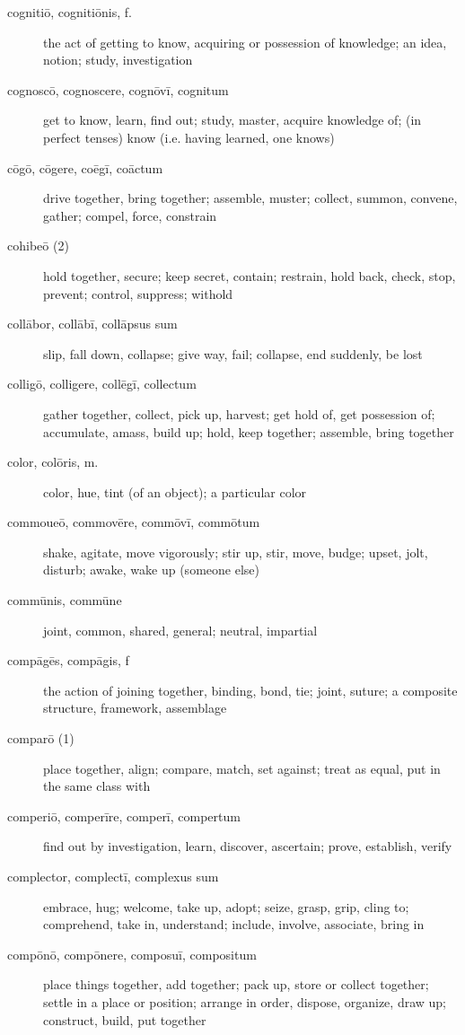 \begin{description}
    \item[cognitiō, cognitiōnis, f.] the act of getting to know, acquiring or possession of knowledge; an idea, notion; study, investigation
    \item[cognoscō, cognoscere, cognōvī, cognitum] get to know, learn, find out; study, master, acquire knowledge of; (in perfect tenses) know (i.e. having learned, one knows)
    \item[cōgō, cōgere, coēgī, coāctum] drive together, bring together; assemble, muster; collect, summon, convene, gather; compel, force, constrain
    \item[cohibeō (2)] hold together, secure; keep secret, contain; restrain, hold back, check, stop, prevent; control, suppress; withold
    \item[collābor, collābī, collāpsus sum] slip, fall down, collapse; give way, fail; collapse, end suddenly, be lost
    \item[colligō, colligere, collēgī, collectum] gather together, collect, pick up, harvest; get hold of, get possession of; accumulate, amass, build up; hold, keep together; assemble, bring together
    \item[color, colōris, m.] color, hue, tint (of an object); a particular color
    \item[commoueō, commovēre, commōvī, commōtum] shake, agitate, move vigorously; stir up, stir, move, budge; upset, jolt, disturb; awake, wake up (someone else)
    \item[commūnis, commūne] joint, common, shared, general; neutral, impartial
    \item[compāgēs, compāgis, f] the action of joining together, binding, bond, tie; joint, suture; a composite structure, framework, assemblage
    \item[comparō (1)] place together, align; compare, match, set against; treat as equal, put in the same class with
    \item[comperiō, comperīre, comperī, compertum] find out by investigation, learn, discover, ascertain; prove, establish, verify
    \item[complector, complectī, complexus sum] embrace, hug; welcome, take up, adopt; seize, grasp, grip, cling to; comprehend, take in, understand; include, involve, associate, bring in
    \item[compōnō, compōnere, composuī, compositum] place things together, add together; pack up, store or collect together; settle in a place or position; arrange in order, dispose, organize, draw up; construct, build, put together

\end{description}
